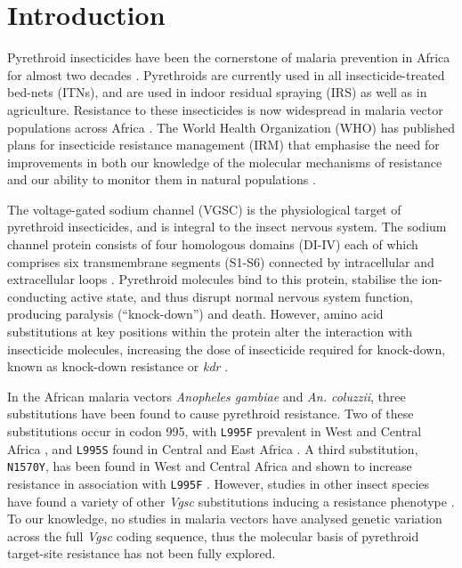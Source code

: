 \documentclass[a4paper,11pt,abstracton,hidelinks]{scrartcl}
\begin{document}
\section*{Introduction}


Pyrethroid insecticides have been the cornerstone of malaria prevention in Africa for almost two decades \cite{Bhatt2015}.
%
Pyrethroids are currently used in all insecticide-treated bed-nets (ITNs), and are used in indoor residual spraying (IRS) as well as in agriculture.
%
Resistance to these insecticides is now widespread in malaria vector populations across Africa \cite{Hemingway2016}.
%
The World Health Organization (WHO) has published plans for insecticide resistance management (IRM) that emphasise the need for improvements in both our knowledge of the molecular mechanisms of resistance and our ability to monitor them in natural populations \cite{WorldHealthOrganization2012,world2017global}.


The voltage-gated sodium channel (VGSC) is the physiological target of pyrethroid insecticides, and is integral to the insect nervous system.
%
The sodium channel protein consists of four homologous domains (DI-IV) each of which comprises six transmembrane segments (S1-S6) connected by intracellular and extracellular loops \cite{Dong2014}.
%
Pyrethroid molecules bind to this protein, stabilise the ion-conducting active state, and thus disrupt normal nervous system function, producing paralysis (``knock-down'') and death.
%
However, amino acid substitutions at key positions within the protein alter the interaction with insecticide molecules, increasing the dose of insecticide required for knock-down, known as knock-down resistance or \textit{kdr} \cite{Davies2007a,Dong2014}.

In the African malaria vectors \textit{Anopheles gambiae} and \textit{An. coluzzii}, three substitutions have been found to cause pyrethroid resistance.
%
Two of these substitutions occur in codon 995\footnotemark, with \texttt{L995F} prevalent in West and Central Africa \cite{Martinez-Torres1998,Silva2014}, and \texttt{L995S} found in Central and East Africa \cite{Ranson2000,Silva2014}.
%
A third substitution, \texttt{N1570Y}, has been found in West and Central Africa and shown to increase resistance in association with \texttt{L995F} \cite{Jones2012}.
%
However, studies in other insect species have found a variety of other \emph{Vgsc} substitutions inducing a resistance phenotype \cite{Davies2007b,Rinkevich2013,Dong2014}.
%
To our knowledge, no studies in malaria vectors have analysed genetic variation across the full \emph{Vgsc} coding sequence, thus the molecular basis of pyrethroid target-site resistance has not been fully explored.
\end{document}
